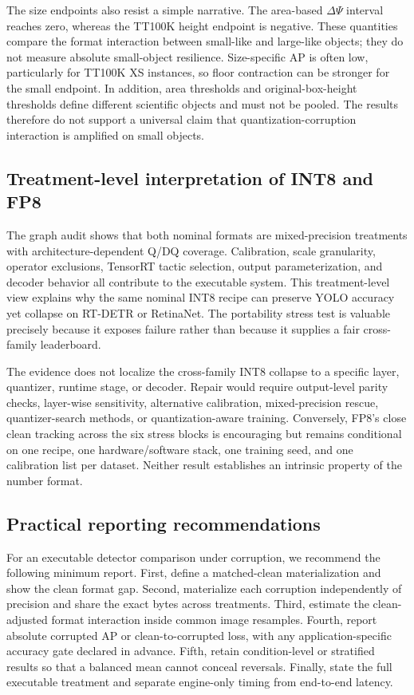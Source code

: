 The size endpoints also resist a simple narrative. The area-based
$\Delta\Psi$ interval reaches zero, whereas the TT100K height endpoint is
negative. These quantities compare the format interaction between small-like
and large-like objects; they do not measure absolute small-object resilience.
Size-specific AP is often low, particularly for TT100K XS instances, so floor
contraction can be stronger for the small endpoint. In addition, area thresholds
and original-box-height thresholds define different scientific objects and must
not be pooled. The results therefore do not support a universal claim that
quantization-corruption interaction is amplified on small objects.

\subsection{Treatment-level interpretation of INT8 and FP8}

The graph audit shows that both nominal formats are mixed-precision treatments
with architecture-dependent Q/DQ coverage. Calibration, scale granularity,
operator exclusions, TensorRT tactic selection, output parameterization, and
decoder behavior all contribute to the executable system. This treatment-level
view explains why the same nominal INT8 recipe can preserve YOLO accuracy yet
collapse on RT-DETR or RetinaNet. The portability stress test is valuable
precisely because it exposes failure rather than because it supplies a fair
cross-family leaderboard.

The evidence does not localize the cross-family INT8 collapse to a specific
layer, quantizer, runtime stage, or decoder. Repair would require output-level
parity checks, layer-wise sensitivity, alternative calibration, mixed-precision
rescue, quantizer-search methods, or quantization-aware training. Conversely,
FP8's close clean tracking across the six stress blocks is encouraging but
remains conditional on one recipe, one hardware/software stack, one training
seed, and one calibration list per dataset. Neither result establishes an
intrinsic property of the number format.

\subsection{Practical reporting recommendations}

For an executable detector comparison under corruption, we recommend the
following minimum report. First, define a matched-clean materialization and
show the clean format gap. Second, materialize each corruption independently of
precision and share the exact bytes across treatments. Third, estimate the
clean-adjusted format interaction inside common image resamples. Fourth, report
absolute corrupted AP or clean-to-corrupted loss, with any application-specific
accuracy gate declared in advance. Fifth, retain condition-level or stratified
results so that a balanced mean cannot conceal reversals. Finally, state the
full executable treatment and separate engine-only timing from end-to-end
latency.

